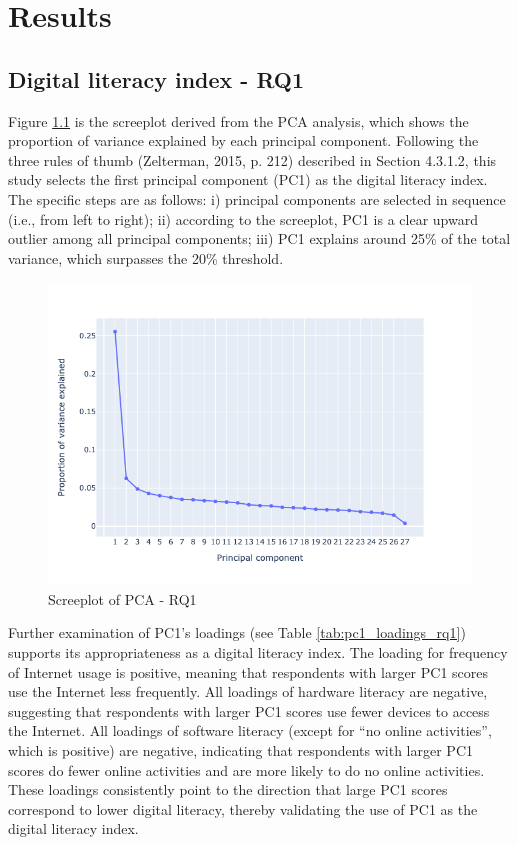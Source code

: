 \chapter{\label{ch:5-result}Results}

\section{Digital literacy index - RQ1}
Figure \ref{fig:screeplot_rq1} is the screeplot derived from the PCA analysis, which shows the proportion of variance explained by each principal component. Following the three rules of thumb (Zelterman, 2015, p. 212) described in Section 4.3.1.2, this study selects the first principal component (PC1) as the digital literacy index. The specific steps are as follows: i) principal components are selected in sequence (i.e., from left to right); ii) according to the screeplot, PC1 is a clear upward outlier among all principal components; iii) PC1 explains around 25\% of the total variance, which surpasses the 20\% threshold. 

\begin{figure}
    \centering
    \caption{Screeplot of PCA - RQ1}
    \label{fig:screeplot_rq1}
    \includegraphics[width=\textwidth]{figures/pca_screeplot_q1.png}
\end{figure}

Further examination of PC1's loadings (see Table \ref{tab:pc1_loadings_rq1}) supports its appropriateness as a digital literacy index. The loading for frequency of Internet usage is positive, meaning that respondents with larger PC1 scores use the Internet less frequently. All loadings of hardware literacy are negative, suggesting that respondents with larger PC1 scores use fewer devices to access the Internet. All loadings of software literacy (except for ``no online activities”, which is positive) are negative, indicating that respondents with larger PC1 scores do fewer online activities and are more likely to do no online activities. These loadings consistently point to the direction that large PC1 scores correspond to lower digital literacy, thereby validating the use of PC1 as the digital literacy index.

